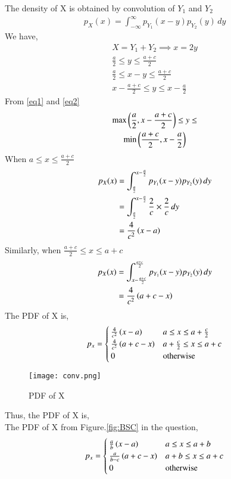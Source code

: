 \documentclass[journal,12pt,twocolumn]{IEEEtran}
\begin{document}
The density of X is obtained by convolution of $Y_1$ and $Y_2$
\begin{align}
p_X(x) =  \int_{- \infty}^{\infty} p_{Y_1}(x-y)p_{Y_2}(y) \,dy
\end{align}
We have,
\begin{align}
    X = Y_1 + Y_2 \implies x = 2y\\
    \label{eq1} \frac{a}{2}\leq y \leq \frac{a+c}{2}\\ 
    \frac{a}{2}\le x-y \le \frac{a+c}{2}\\
    \label{eq2} x-\frac{a+c}{2}\le y \le x-\frac{a}{2}
\end{align}
From \eqref{eq1} and \eqref{eq2}
\begin{multline}
    \max\left(\frac{a}{2}, x-\frac{a+c}{2}\right)\le y \le\\
    \min\left(\frac{a+c}{2}, x-\frac{a}{2}\right)
\end{multline}
When $a \le x \le \frac{a+c}{2}$
\begin{align}
    p_X(x) & = \int_{\frac{a}{2}}^{x-\frac{a}{2}} p_{Y_1}(x-y)p_{Y_2}(y)\,dy\\
    & = \int_{\frac{a}{2}}^{x-\frac{a}{2}} \frac{2}{c}\times\frac{2}{c}\,dy\\
    & = \frac{4}{c^2}\left(x-a\right)
\end{align}
Similarly, when $\frac{a+c}{2} \le x \le a+c $
\begin{align}
    p_X(x) & = \int_{x-\frac{a+c}{2}}^{\frac{a+c}{2}} p_{Y_1}(x-y)p_{Y_2}(y)\,dy\\
    & = \frac{4}{c^2}\left(a+c-x\right)
\end{align}
The PDF of X is,
\begin{align}
p_x = 
\begin{cases}
\frac{4}{c^2}\left(x-a\right) & a \le x \le a+\frac{c}{2}\\
\frac{4}{c^2}\left(a+c-x\right) & a+\frac{c}{2} \le x \le a+c \\
0 & \text{otherwise}
\end{cases}
\end{align}
\begin{figure}[h!]
\centering
\texttt{[image: conv.png]}
\caption{PDF of X}
\label{fig:convolution}
\end{figure}
Thus, the PDF of X is,\\
The PDF of X from Figure.\ref{fig:BSC} in the question,
\begin{align}
p_x = 
\begin{cases}
\frac{a}{b}\left(x-a\right) & a \le x \le a+b\\
\frac{a}{b-c}\left(a+c-x\right) & a+b \le x \le a+c \\
0 & \text{otherwise}
\end{cases}
\end{align}
\end{document}
